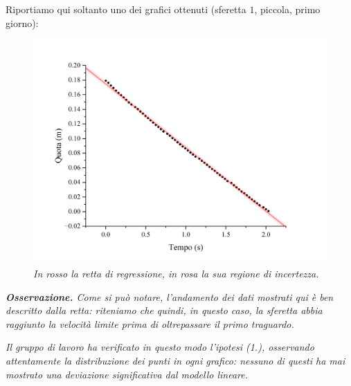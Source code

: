 \documentclass{article}
\begin{document}
Riportiamo qui soltanto uno dei grafici ottenuti
(sferetta $1$, piccola, primo giorno):
\begin{figure}[H]
  \centering
  \includegraphics[trim={1.5cm 0.6cm 2cm 1cm},clip,width=\textwidth]{img/reg-p.png}
  \caption{\emph{
    In rosso la retta di regressione, in rosa la sua regione di incertezza.
  }}
\end{figure}

\emph{
  \textbf{Osservazione.} Come si può notare, l'andamento dei dati mostrati qui
  è ben descritto dalla retta: riteniamo che quindi, in questo caso, la sferetta
  abbia raggiunto la velocità limite prima di oltrepassare il primo traguardo.
}

\emph{
  Il gruppo di lavoro ha verificato in questo modo l'ipotesi (1.), osservando
  attentamente la distribuzione dei punti in ogni grafico: nessuno di questi
  ha mai mostrato una deviazione significativa dal modello lineare.
}
\end{document}
